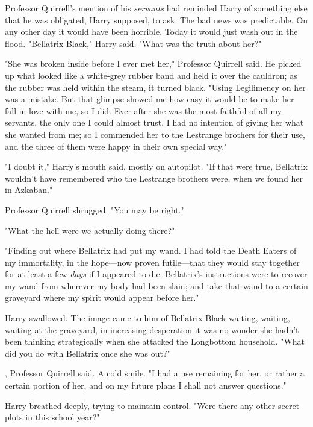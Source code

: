 Professor Quirrell's mention of his \emph{servants} had reminded Harry of
something else that he was{\el} obligated, Harry supposed, to ask. The bad
news was predictable. On any other day it would have been horrible. Today it
would just wash out in the flood. "Bellatrix Black," Harry said. "What was the
truth about her?"

"She was broken inside before I ever met her," Professor Quirrell said. He
picked up what looked like a white-grey rubber band and held it over the
cauldron; as the rubber was held within the steam, it turned black. "Using
Legilimency on her was a mistake. But that glimpse showed me how easy it would
be to make her fall in love with me, so I did. Ever after she was the most
faithful of all my servants, the only one I could almost trust. I had no
intention of giving her what she wanted from me; so I commended her to the
Lestrange brothers for their use, and the three of them were happy in their own
special way."

"I doubt it," Harry's mouth said, mostly on autopilot. "If that were true,
Bellatrix wouldn't have remembered who the Lestrange brothers were, when we
found her in Azkaban."

Professor Quirrell shrugged. "You may be right."

"What the hell were we actually doing there?"

"Finding out where Bellatrix had put my wand. I had told the Death Eaters of my
immortality, in the hope---now proven futile---that they would stay together
for at least a few \emph{days} if I appeared to die. Bellatrix's instructions
were to recover my wand from wherever my body had been slain; and take that
wand to a certain graveyard where my spirit would appear before her."

Harry swallowed. The image came to him of Bellatrix Black waiting, waiting,
waiting at the graveyard, in increasing desperation{\el} it was no wonder
she hadn't been thinking strategically when she attacked the Longbottom
household. "What did you do with Bellatrix once she was out?"

, Professor Quirrell
said. A cold smile. "I had a use remaining for her, or rather a certain portion
of her, and on my future plans I shall not answer questions."

Harry breathed deeply, trying to maintain control. "Were there any other secret
plots in this school year?"

